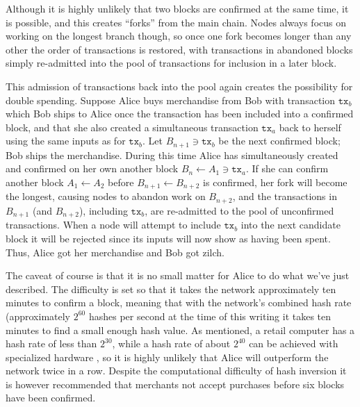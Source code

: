 \documentclass[a4paper,12pt]{article}
\begin{document}
Although it is highly unlikely that two blocks are confirmed at the same time, it is possible, and this creates “forks” from the main chain. Nodes always focus on working on the longest branch though, so once one fork becomes longer than any other the order of transactions is restored, with transactions in abandoned blocks simply re-admitted into the pool of transactions for inclusion in a later block. \cite[p. 12]{kobmen}

This admission of transactions back into the pool again creates the possibility for double spending. Suppose Alice buys merchandise from Bob with transaction $\texttt{tx}_b$ which Bob ships to Alice once the transaction has been included into a confirmed block, and that she also created a simultaneous transaction $\texttt{tx}_a$ back to herself using the same inputs as for $\texttt{tx}_b$. Let $B_{n+1} \ni \texttt{tx}_b$ be the next confirmed block; Bob ships the merchandise. During this time Alice has simultaneously created and confirmed on her own another block $B_n \leftarrow A_1 \ni \texttt{tx}_a$. If she can confirm another block $A_1 \leftarrow A_2$ before $B_{n+1} \leftarrow B_{n+2}$ is confirmed, her fork will become the longest, causing nodes to abandon work on $B_{n+2}$, and the transactions in $B_{n+1}$ (and $B_{n+2}$), including $\texttt{tx}_b$, are re-admitted to the pool of unconfirmed transactions. When a node will attempt to include $\texttt{tx}_b$ into the next candidate block it will be rejected since its inputs will now show as having been spent. Thus, Alice got her merchandise and Bob got zilch.

The caveat of course is that it is no small matter for Alice to do what we've just described. The difficulty is set so that it takes the network approximately ten minutes to confirm a block, meaning that with the network's combined hash rate (approximately $2^{60}$ hashes per second at the time of this writing \cite{hashrate} it takes ten minutes to find a small enough hash value. As mentioned, a retail computer has a hash rate of less than $2^{30}$, while a hash rate of about $2^{40}$ can be achieved with specialized hardware \cite{hashspecialized}, so it is highly unlikely that Alice will outperform the network twice in a row. Despite the computational difficulty of hash inversion it is however recommended that merchants not accept purchases before six blocks have been confirmed.



\begin{comment}
VERY NICE ALGORITHM FORMAT HERE:
\begin{algorithm}
\textbf{INPUT:} Two polynomials $f,g$\\
\textbf{OUTPUT:} ---
\begin{algorithmic}
\STATE initialize $r = f$, $d=0$.
\WHILE{$deg(f) \geq deg(g)$}
\STATE $d = \texttt{lead}(f)/ \texttt{lead}(g)$
\ENDWHILE
\end{algorithmic}
\caption{Algorithm to create polygon intersection graph}
\label{algo:relgraph}
\end{algorithm}
\end{comment}
\end{document}
